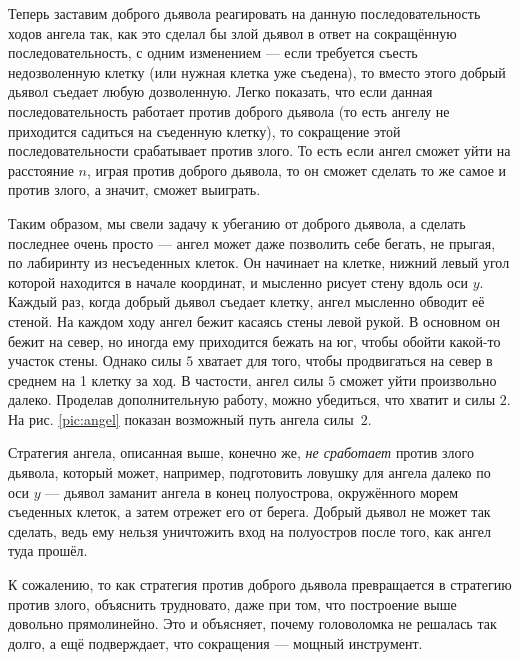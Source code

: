 Теперь заставим доброго дьявола реагировать на данную последовательность ходов ангела так, как это сделал бы злой дьявол в ответ на сокращённую последовательность, с одним изменением --- если требуется съесть недозволенную клетку (или нужная клетка уже съедена), то вместо этого добрый дьявол съедает любую дозволенную.
Легко показать, что если данная последовательность работает против доброго дьявола (то есть ангелу не приходится садиться на съеденную клетку), то сокращение этой последовательности срабатывает против злого.
То есть если ангел сможет уйти на расстояние $n$, играя против доброго дьявола, то он сможет сделать то же самое и против злого, а значит, сможет выиграть.

Таким образом, мы свели задачу к убеганию от доброго дьявола, а сделать последнее очень просто ---
ангел может даже позволить себе бегать, не прыгая, по лабиринту из несъеденных клеток.
Он начинает на клетке, нижний левый угол которой находится в начале координат,
и мысленно рисует стену вдоль оси $y$.
Каждый раз, когда добрый дьявол съедает клетку, ангел мысленно обводит её стеной.
На каждом ходу ангел бежит касаясь стены левой рукой.
В основном он бежит на север, но иногда ему приходится бежать на юг, чтобы обойти какой-то участок стены.
Однако силы $5$ хватает для того, чтобы продвигаться на север в среднем на 1 клетку за ход.
В частости, ангел силы $5$ сможет уйти произвольно далеко.
Проделав дополнительную работу, можно убедиться, что хватит и силы $2$.
На рис. \ref{pic:angel} показан возможный путь ангела силы~$2$.

Стратегия ангела, описанная выше, конечно же, \emph{не сработает} против злого дьявола, который может, например, подготовить ловушку для ангела далеко по оси $y$ --- дьявол заманит ангела в конец полуострова, окружённого морем съеденных клеток, а затем отрежет его от берега.
Добрый дьявол не может так сделать, ведь ему нельзя уничтожить вход на полуостров после того, как ангел туда прошёл.

К сожалению, то как стратегия против доброго дьявола превращается в стратегию против злого, объяснить трудновато, даже при том, что построение выше довольно прямолинейно.
Это и объясняет, почему головоломка не решалась так долго, а ещё подверждает, что сокращения --- мощный инструмент.

